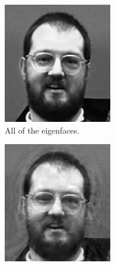 \begin{figure}
\begin{subfigure}[b]{0.3\textwidth}
\includegraphics[width=\textwidth]{rebuiltAll.png}
\caption{All of the eigenfaces.}
\end{subfigure}
\begin{subfigure}[b]{0.3\textwidth}
\includegraphics[width=\textwidth]{rebuiltHalf.png}

\end{subfigure}
\end{figure}
